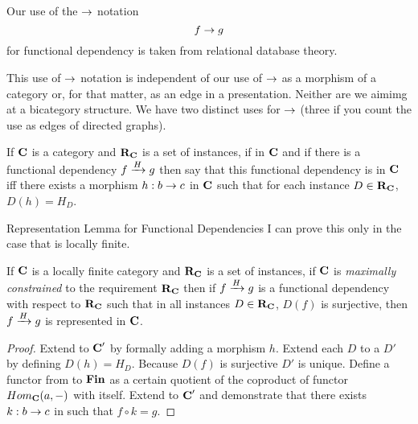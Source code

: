 \documentclass[xcolor=pst,dvips]{beamer}   %
\begin{document}
\begin{frame}
Our use of the $\morph$ notation 
$$
f \morph g
$$
for functional dependency is taken from relational database theory. 

This use of $\morph$ notation is independent of our use of $\morph$ as a morphism of a category 
or, for that matter, as an edge in a presentation. Neither are we aimimg at a bicategory structure. 
We have two distinct uses for $\morph$ (three if you count the use as edges of directed graphs). 
\end{frame}

\begin{frame}
\begin{definition}
If $\catc$ is a category and $\reqtc$ is a set of instances, 
if \fgsourcediag in $\catc$ 
and if there is a functional dependency $\fundep{H}{f}{g}$ then say that 
this functional dependency  is  in $\catc$ 
iff there exists a morphism $h:b \morph c$ in $\catc$ such that for each instance $D \in \reqtc$, $D(h)=H_D$.
\end{definition}
\end{frame}


\begin{frame}{Representation Lemma for Functional Dependencies}
I can prove this only in the case that \catcw is locally finite.

\begin{lemma}
If $\catc$ is a locally finite category and $\reqtc$ is a set of instances, if $\catc$ is 
\textit{maximally constrained} to the requirement $\reqtc$ then
if $\fundep{H}{f}{g}$  is a functional dependency with respect to $\reqtc$
such that in all instances $D \in \reqtc$, $D(f)$ is surjective,
then $\fundep{H}{f}{g}$ is represented in $\catc$.
\end{lemma}
\begin{proof}
Extend \catcw to $\catcp$ by formally adding a morphism $h$. Extend each $D$ to a $D'$ by defining $D(h)=H_D$. 
Because $D(f)$ is surjective $D'$ is unique. 
Define a functor from \catcw to $\Fin$ as  a certain quotient of the coproduct of functor $Hom_{\catc}(a,-)$ with itself.
Extend to $\catcp$ and demonstrate that there exists $k:b \morph c$ in \catcw such that $f \circ k=g$. 
\end{proof}
\end{frame}
\end{document}

